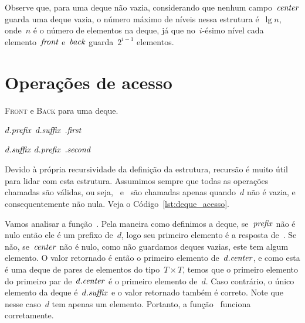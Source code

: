 \documentclass[main.tex]{subfiles}
\begin{document}
Observe que, para uma deque não vazia, considerando que nenhum campo~$\mathit{center}$ guarda uma deque vazia, o número máximo de níveis nessa estrutura é~$\lg n$, onde~$n$ é o número de elementos na deque, já que no~$i$-ésimo nível cada elemento~$\mathit{front}$ e~$\mathit{back}$ guarda~$2^{i-1}$ elementos.


\section{Operações de acesso}


\begin{algorithm}
\caption{\textsc{Front} e \textsc{Back} para uma deque.} \label{lst:deque_acesso}
\begin{algorithmic}[1]

    \State \Return \Null
\EndFunction

        \State \Return $d.\mathit{prefix}$
        \State \Return $d.\mathit{suffix}$
    \Else
        \State \Return {}$.\mathit{first}$
    \EndIf
\EndFunction

        \State \Return $d.\mathit{suffix}$
        \State \Return $d.\mathit{prefix}$
    \Else
        \State \Return {}$.\mathit{second}$
    \EndIf
\EndFunction


\end{algorithmic}
\end{algorithm}

Devido à própria recursividade da definição da estrutura, recursão é muito útil para lidar com esta estrutura.
Assumimos sempre que todas as operações chamadas são válidas, ou seja,~ e~ são chamadas apenas quando~$d$ não é vazia, e consequentemente não nula. Veja o Código~\ref{lst:deque_acesso}.

Vamos analisar a função~. Pela maneira como definimos a deque, se~$\mathit{prefix}$ não é nulo então ele é um prefixo de~$d$, logo seu primeiro elemento é a resposta de~. Se não, se~$\mathit{center}$ não é nulo, como não guardamos deques vazias, este tem algum elemento. O valor retornado é então o primeiro elemento de~$d.\mathit{center}$, e como esta é uma deque de pares de elementos do tipo~$T \times T$, temos que o primeiro elemento do primeiro par de~$d.\mathit{center}$ é o primeiro elemento de~$d$. Caso contrário, o único elemento da deque é~$d.\mathit{suffix}$ e o valor retornado também é correto. Note que nesse caso~$d$ tem apenas um elemento.
Portanto, a função~ funciona corretamente.
\end{document}
